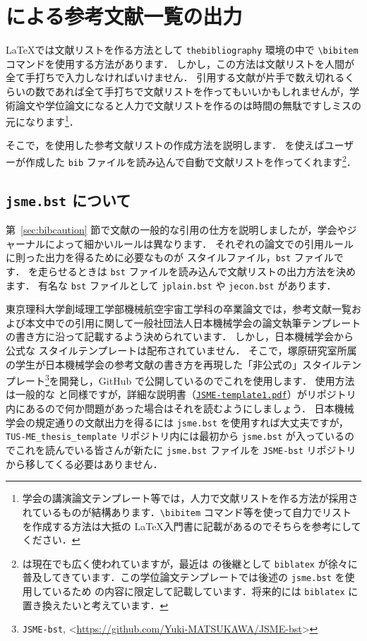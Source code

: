 \chapter{\BibTeX による参考文献一覧の出力}
\label{ch:bibtex}

\LaTeX では文献リストを作る方法として \verb|thebibliography| 環境の中で \verb|\bibitem| コマンドを使用する方法があります．
しかし，この方法は文献リストを人間が全て手打ちで入力しなければいけません．
引用する文献が片手で数え切れるくらいの数であれば全て手打ちで文献リストを作ってもいいかもしれませんが，学術論文や学位論文になると人力で文献リストを作るのは時間の無駄ですしミスの元になります\footnote{学会の講演論文テンプレート等では，人力で文献リストを作る方法が採用されているものが結構あります．\texttt{\textbackslash bibitem} コマンド等を使って自力でリストを作成する方法は大抵の \LaTeX 入門書に記載があるのでそちらを参考にしてください．}．

そこで，\BibTeX を使用した参考文献リストの作成方法を説明します．
\BibTeX を使えばユーザーが作成した \verb|bib| ファイルを読み込んで自動で文献リストを作ってくれます\footnote{\BibTeX は現在でも広く使われていますが，最近は \BibTeX の後継として \texttt{biblatex} が徐々に普及してきています．この学位論文テンプレートでは後述の \texttt{jsme.bst} を使用しているため \BibTeX の内容に限定して記載しています．将来的には \texttt{biblatex} に置き換えたいと考えています．}．

\section{\texttt{jsme.bst} について}
\label{sec:jsme-bst}

第~\ref{sec:bibcaution} 節で文献の一般的な引用の仕方を説明しましたが，学会やジャーナルによって細かいルールは異なります．
それぞれの論文での引用ルールに則った出力を得るために必要なものが \BibTeX スタイルファイル，\verb|bst| ファイルです．
\BibTeX を走らせるときは \verb|bst| ファイルを読み込んで文献リストの出力方法を決めます．
有名な \verb|bst| ファイルとして \verb|jplain.bst| や \verb|jecon.bst| があります．

東京理科大学創域理工学部機械航空宇宙工学科の卒業論文では，参考文献一覧および本文中での引用に関して一般社団法人日本機械学会の論文執筆テンプレートの書き方に沿って記載するよう決められています．
しかし，日本機械学会から公式な \BibTeX スタイルテンプレートは配布されていません．
そこで，塚原研究室所属の学生が日本機械学会の参考文献の書き方を再現した「非公式の」\BibTeX スタイルテンプレート\footnote{\texttt{JSME-bst}, \textless\url{https://github.com/Yuki-MATSUKAWA/JSME-bst}\textgreater}を開発し，GitHub で公開しているのでこれを使用します．
使用方法は一般的な \BibTeX と同様ですが，詳細な説明書（\href{https://github.com/Yuki-MATSUKAWA/JSME-bst/blob/main/JSME-template1.pdf}{\texttt{JSME-template1.pdf}}）がリポジトリ内にあるので何か問題があった場合はそれを読むようにしましょう．
日本機械学会の規定通りの文献出力を得るには \verb|jsme.bst| を使用すれば大丈夫ですが，\verb|TUS-ME_thesis_template| リポジトリ内には最初から \verb|jsme.bst| が入っているのでこれを読んでいる皆さんが新たに \verb|jsme.bst| ファイルを \verb|JSME-bst| リポジトリから移してくる必要はありません．

